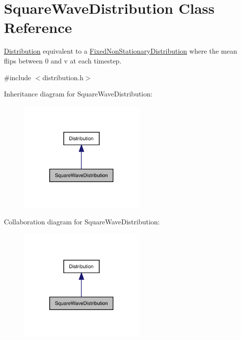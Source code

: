 \hypertarget{class_square_wave_distribution}{}\section{Square\+Wave\+Distribution Class Reference}
\label{class_square_wave_distribution}


\mbox{\hyperlink{class_distribution}{Distribution}} equivalent to a \mbox{\hyperlink{class_fixed_non_stationary_distribution}{Fixed\+Non\+Stationary\+Distribution}} where the mean flips between 0 and v at each timestep.  




{\ttfamily \#include $<$distribution.\+h$>$}



Inheritance diagram for Square\+Wave\+Distribution\+:
\nopagebreak
\begin{figure}[H]
\begin{center}
\leavevmode
\includegraphics[width=177pt]{class_square_wave_distribution__inherit__graph}
\end{center}
\end{figure}


Collaboration diagram for Square\+Wave\+Distribution\+:
\nopagebreak
\begin{figure}[H]
\begin{center}
\leavevmode
\includegraphics[width=177pt]{class_square_wave_distribution__coll__graph}
\end{center}
\end{figure}
